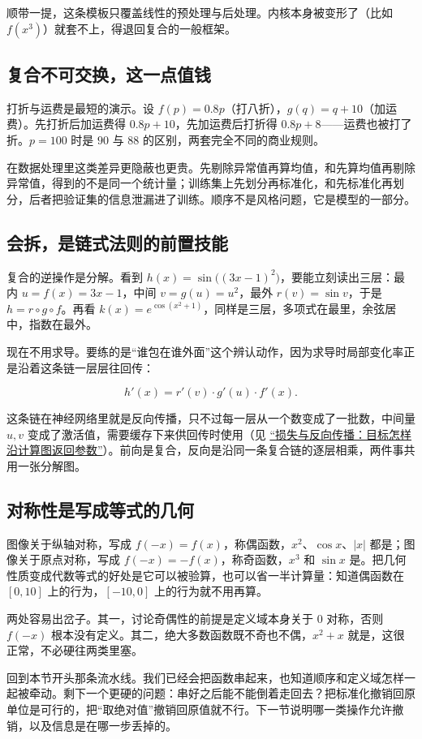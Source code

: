顺带一提，这条模板只覆盖线性的预处理与后处理。内核本身被变形了（比如 \(f(x^3)\)）就套不上，得退回复合的一般框架。

\subsection{复合不可交换，这一点值钱}

打折与运费是最短的演示。设 \(f(p)=0.8p\)（打八折），\(g(q)=q+10\)（加运费）。先打折后加运费得 \(0.8p+10\)，先加运费后打折得 \(0.8p+8\)——运费也被打了折。\(p=100\) 时是 \(90\) 与 \(88\) 的区别，两套完全不同的商业规则。

在数据处理里这类差异更隐蔽也更贵。先剔除异常值再算均值，和先算均值再剔除异常值，得到的不是同一个统计量；训练集上先划分再标准化，和先标准化再划分，后者把验证集的信息泄漏进了训练。顺序不是风格问题，它是模型的一部分。

\subsection{会拆，是链式法则的前置技能}

复合的逆操作是分解。看到 \(h(x)=\sin\bigl((3x-1)^2\bigr)\)，要能立刻读出三层：最内 \(u=f(x)=3x-1\)，中间 \(v=g(u)=u^2\)，最外 \(r(v)=\sin v\)，于是 \(h=r\circ g\circ f\)。再看 \(k(x)=e^{\cos(x^2+1)}\)，同样是三层，多项式在最里，余弦居中，指数在最外。

现在不用求导。要练的是``谁包在谁外面''这个辨认动作，因为求导时局部变化率正是沿着这条链一层层往回传：

\[
h'(x)=r'(v)\cdot g'(u)\cdot f'(x).
\]

这条链在神经网络里就是反向传播，只不过每一层从一个数变成了一批数，中间量 \(u,v\) 变成了激活值，需要缓存下来供回传时使用（见 \hyperref[ch:124]{``损失与反向传播：目标怎样沿计算图返回参数''}）。前向是复合，反向是沿同一条复合链的逐层相乘，两件事共用一张分解图。

\subsection{对称性是写成等式的几何}

图像关于纵轴对称，写成 \(f(-x)=f(x)\)，称偶函数，\(x^2\)、\(\cos x\)、\(|x|\) 都是；图像关于原点对称，写成 \(f(-x)=-f(x)\)，称奇函数，\(x^3\) 和 \(\sin x\) 是。把几何性质变成代数等式的好处是它可以被验算，也可以省一半计算量：知道偶函数在 \([0,10]\) 上的行为，\([-10,0]\) 上的行为就不用再算。

两处容易出岔子。其一，讨论奇偶性的前提是定义域本身关于 \(0\) 对称，否则 \(f(-x)\) 根本没有定义。其二，绝大多数函数既不奇也不偶，\(x^2+x\) 就是，这很正常，不必硬往两类里塞。

回到本节开头那条流水线。我们已经会把函数串起来，也知道顺序和定义域怎样一起被牵动。剩下一个更硬的问题：串好之后能不能倒着走回去？把标准化撤销回原单位是可行的，把``取绝对值''撤销回原值就不行。下一节说明哪一类操作允许撤销，以及信息是在哪一步丢掉的。
